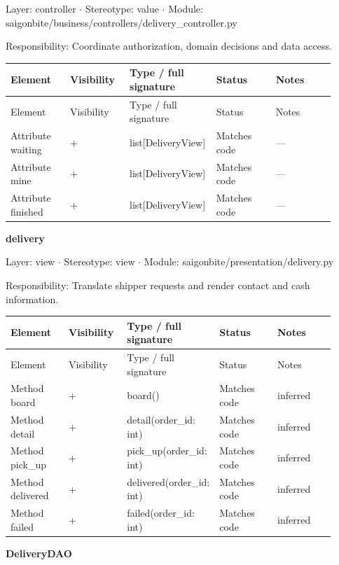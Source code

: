 Layer: controller \ensuremath{\cdot} Stereotype: \guillemotleft{}value\guillemotright{} \ensuremath{\cdot} Module: saigonbite/business/controllers/delivery\_controller.py

Responsibility: Coordinate authorization, domain decisions and data access.

\begin{longtable}{>{\raggedright\arraybackslash}p{0.1840\linewidth}>{\raggedright\arraybackslash}p{0.1840\linewidth}>{\raggedright\arraybackslash}p{0.1840\linewidth}>{\raggedright\arraybackslash}p{0.1840\linewidth}>{\raggedright\arraybackslash}p{0.1840\linewidth}}
Element & Visibility & Type / full signature & Status & Notes \\
\hline\endfirsthead
Element & Visibility & Type / full signature & Status & Notes \\
\hline\endhead
Attribute waiting & + & list[DeliveryView] & Matches code & --- \\
Attribute mine & + & list[DeliveryView] & Matches code & --- \\
Attribute finished & + & list[DeliveryView] & Matches code & --- \\
\end{longtable}
\textbf{delivery}

Layer: view \ensuremath{\cdot} Stereotype: \guillemotleft{}view\guillemotright{} \ensuremath{\cdot} Module: saigonbite/presentation/delivery.py

Responsibility: Translate shipper requests and render contact and cash information.

\begin{longtable}{>{\raggedright\arraybackslash}p{0.1840\linewidth}>{\raggedright\arraybackslash}p{0.1840\linewidth}>{\raggedright\arraybackslash}p{0.1840\linewidth}>{\raggedright\arraybackslash}p{0.1840\linewidth}>{\raggedright\arraybackslash}p{0.1840\linewidth}}
Element & Visibility & Type / full signature & Status & Notes \\
\hline\endfirsthead
Element & Visibility & Type / full signature & Status & Notes \\
\hline\endhead
Method board & + & board() & Matches code & inferred \\
Method detail & + & detail(order\_id: int) & Matches code & inferred \\
Method pick\_up & + & pick\_up(order\_id: int) & Matches code & inferred \\
Method delivered & + & delivered(order\_id: int) & Matches code & inferred \\
Method failed & + & failed(order\_id: int) & Matches code & inferred \\
\end{longtable}
\textbf{DeliveryDAO}

